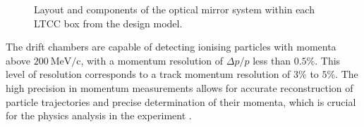     \begin{wrapfigure}{l}{0.50\textwidth}
        \caption[Low Threshold Cherenkov Counter (LTCC) Mirror System]
        {Layout and components of the optical mirror system within each LTCC box from the design model.}
        \label{fig::11.213::ltcc}
    \end{wrapfigure}

    The drift chambers are capable of detecting ionising particles with momenta above $200 ~\text{MeV}/\text{c}$, with a momentum resolution of $\Delta p/p$ less than $0.5\%$. This level of resolution corresponds to a track momentum resolution of $3\%$ to $5\%$.
    The high precision in momentum measurements allows for accurate reconstruction of particle trajectories and precise determination of their momenta, which is crucial for the physics analysis in the experiment \cite{mestayer2020}.
